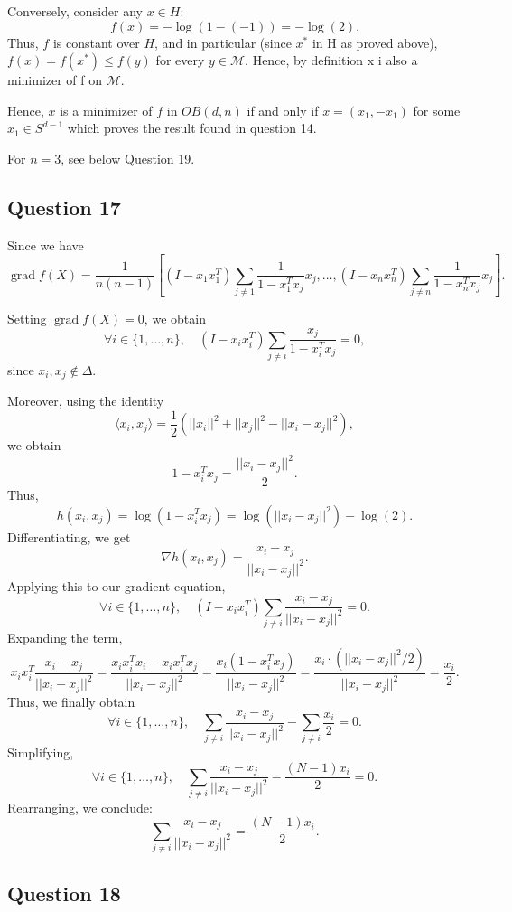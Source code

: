 \documentclass{article}
\begin{document}
Conversely, consider any $x \in H$:
\begin{equation}
    f(x) = -\log(1 - (-1)) = -\log(2).
\end{equation}
Thus, $f$ is constant over $H$, and in particular (since $x^*$ in H as proved above), $f(x) = f(x^*) \leq f(y)$ for every $y \in \mathcal{M}$. Hence, by definition x i also a minimizer of f on $\mathcal{M}$.


Hence, $x$ is a minimizer of $f$ in $OB(d,n)$ if and only if $x = (x_1, -x_1)$ for some $x_1 \in S^{d-1}$ which proves the result found in question 14. 

For \( n = 3 \), see below Question 19.

\subsection*{Question 17}  
    Since we have  
\[
\operatorname{grad} f(X) = \frac{1}{n(n-1)}  
\left[  
(I - x_1 x_1^T) \sum_{j \neq 1} \frac{1}{1 - x_1^T x_j} x_j,  
\ldots,  
(I - x_n x_n^T) \sum_{j \neq n} \frac{1}{1 - x_n^T x_j} x_j  
\right].
\]  

Setting \( \operatorname{grad} f(X) = 0 \), we obtain  
\[
\forall i \in \{1, \dots, n\}, \quad  (I - x_i x_i^T) \sum_{j \neq i} \frac{x_j}{1 - x_i^T x_j} = 0,  
\]
since \( x_i, x_j \notin \Delta \).

Moreover, using the identity
\[
\langle x_i, x_j \rangle = \frac{1}{2} (||x_i||^2 + ||x_j||^2 - ||x_i - x_j||^2),
\]
we obtain
\[
1 - x_i^T x_j = \frac{||x_i - x_j||^2}{2}.
\]
Thus,
\[
h(x_i, x_j) = \log (1 - x_i^T x_j) = \log(||x_i - x_j||^2) - \log(2).
\]
Differentiating, we get
\[
\nabla h(x_i, x_j) = \frac{x_i - x_j}{||x_i - x_j||^2}.
\]
Applying this to our gradient equation,
\[
\forall i \in \{1, \dots, n\}, \quad (I - x_i x_i^T) \sum_{j \neq i} \frac{x_i - x_j}{||x_i - x_j||^2} = 0.
\]
Expanding the term,
\[
x_i x_i^T \frac{x_i - x_j}{||x_i - x_j||^2} = \frac{x_i x_i^T x_i - x_i x_i^T x_j}{||x_i - x_j||^2} = \frac{x_i (1 - x_i^T x_j)}{||x_i - x_j||^2} = \frac{x_i \cdot (||x_i - x_j||^2 / 2)}{||x_i - x_j||^2} = \frac{x_i}{2}.
\]
Thus, we finally obtain
\[
\forall i \in \{1, \dots, n\}, \quad \sum_{j \neq i} \frac{x_i - x_j}{||x_i - x_j||^2} - \sum_{j \neq i} \frac{x_i}{2} = 0.
\]
Simplifying,
\[
\forall i \in \{1, \dots, n\}, \quad \sum_{j \neq i} \frac{x_i - x_j}{||x_i - x_j||^2} - \frac{(N-1) x_i}{2} = 0.
\]
Rearranging, we conclude:
\[
\sum_{j \neq i} \frac{x_i - x_j}{||x_i - x_j||^2} = \frac{(N-1) x_i}{2}.
\]


\subsection*{Question 18}
\end{document}
